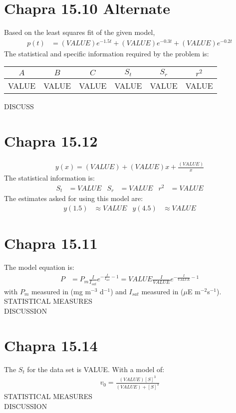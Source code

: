 \documentclass{article}
\begin{document}
\section{Chapra 15.10 Alternate}
Based on the least squares fit of the given model,
\begin{align*}
p(t)&=(VALUE)e^{-1.5t} + (VALUE)e^{-0.3t}+(VALUE)e^{-0.2t}
\end{align*}
The statistical and specific information required by the problem is:
\begin{center}
\begin{tabular}{|c|c|c|c|c|c|}\hline
$A$ & $B$ & $C$ & $S_t$ & $S_r$ & $r^2$\\ \hline
VALUE & VALUE & VALUE & VALUE & VALUE & VALUE \\ \hline
\end{tabular}
\end{center}
DISCUSS

\section{Chapra 15.12}
\begin{align*}
y(x) = (VALUE) + (VALUE)x + \frac{(VALUE)}{x}
\end{align*}
The statistical information is:
\begin{align*}
S_t&=VALUE & S_r &=VALUE  & r^2 &=VALUE
\end{align*}
The estimates asked for using this model are:
\begin{align*}
y(1.5)&\approx VALUE & y(4.5)&\approx VALUE
\end{align*}

\section{Chapra 15.11}
The model equation is:
\begin{align*}
P&=P_m\frac{I}{I_{sat}}e^{-\frac{I}{I_{sat}}-1}=
VALUE\frac{I}{VALUE}e^{-\frac{I}{VALUE}-1}
\end{align*}
with $P_m$ measured in (mg m$^{-3}$ d$^{-1}$) and $I_{sat}$ measured in ($\mu$E m$^{-2}$s$^{-1}$).
STATISTICAL MEASURES\\
DISCUSSION

\section{Chapra 15.14}
The $S_t$ for the data set is VALUE.  With a model of:
\begin{align*}
v_0=\frac{(VALUE)[S]^3}{(VALUE)+[S]^3}
\end{align*}
STATISTICAL MEASURES\\
DISCUSSION
\end{document}
